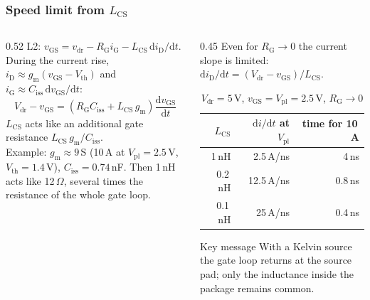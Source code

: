 \begin{frame}
	\frametitle{Speed limit from $L_\mathrm{CS}$}
	\begin{columns}[T]
		\begin{column}{0.52\textwidth}
			\small
			L2: $v_\mathrm{GS}=v_\mathrm{dr}-R_\mathrm{G}i_\mathrm{G}-L_\mathrm{CS}\,\mathrm{d}i_\mathrm{D}/\mathrm{d}t$. During the current rise, $i_\mathrm{D}\approx g_\mathrm{m}(v_\mathrm{GS}-V_\mathrm{th})$ and $i_\mathrm{G}\approx C_\mathrm{iss}\,\mathrm{d}v_\mathrm{GS}/\mathrm{d}t$:
			\begin{equation*}
				V_\mathrm{dr}-v_\mathrm{GS}=\left(R_\mathrm{G}C_\mathrm{iss}+L_\mathrm{CS}\,g_\mathrm{m}\right)\frac{\mathrm{d}v_\mathrm{GS}}{\mathrm{d}t}
			\end{equation*}
			$L_\mathrm{CS}$ acts like an additional gate resistance $L_\mathrm{CS}\,g_\mathrm{m}/C_\mathrm{iss}$.\\[0.4em]
			Example: $g_\mathrm{m}\approx9$\,S (10\,A at $V_\mathrm{pl}=2.5$\,V, $V_\mathrm{th}=1.4$\,V), $C_\mathrm{iss}=0.74$\,nF. Then 1\,nH acts like 12\,$\Omega$, several times the resistance of the whole gate loop.
		\end{column}
		\begin{column}{0.45\textwidth}
			\small
			Even for $R_\mathrm{G}\rightarrow0$ the current slope is limited: $\mathrm{d}i_\mathrm{D}/\mathrm{d}t=(V_\mathrm{dr}-v_\mathrm{GS})/L_\mathrm{CS}$.
			\begin{table}
				\centering
				\footnotesize
				\begin{tabular}{|r|r|r|}
					\hline
					$L_\mathrm{CS}$ & $\mathrm{d}i/\mathrm{d}t$ at $V_\mathrm{pl}$ & time for 10\,A \\
					\hline
					1\,nH           & 2.5\,A/ns                                    & 4\,ns          \\
					0.2\,nH         & 12.5\,A/ns                                   & 0.8\,ns        \\
					0.1\,nH         & 25\,A/ns                                     & 0.4\,ns        \\
					\hline
				\end{tabular}
				\caption{$V_\mathrm{dr}=5$\,V, $v_\mathrm{GS}=V_\mathrm{pl}=2.5$\,V, $R_\mathrm{G}\rightarrow0$}
			\end{table}
			\begin{block}{Key message}
				With a Kelvin source the gate loop returns at the source pad; only the inductance inside the package remains common.
			\end{block}
		\end{column}
	\end{columns}
\end{frame}

